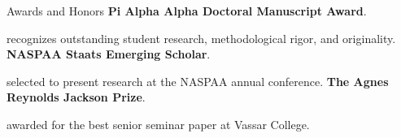 \begin{rubric}{Awards and Honors}
\entry*[2020]%
    \textbf{Pi Alpha Alpha Doctoral Manuscript Award}.
    \par recognizes outstanding student research, methodological rigor, and originality.
\entry*[2020]%
    \textbf{NASPAA Staats Emerging Scholar}.
    \par selected to present research at the NASPAA annual conference.
\entry*[2016]%
    \textbf{The Agnes Reynolds Jackson Prize}.
    \par awarded for the best senior seminar paper at Vassar College.
\end{rubric}
